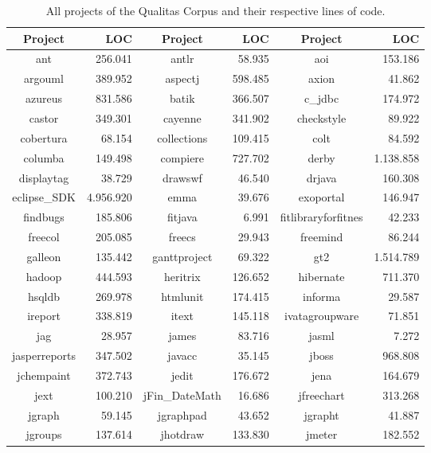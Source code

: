 \setlength{\extrarowheight}{-0.02em}
\begin{table}
	\caption[Overview over the projects in the Qualitas Corpus.]{All projects of the Qualitas Corpus and their respective lines of code.}
	\label{table:qualitasCorpusAll}
	\begin{tabularx}{\textwidth}{c|r||c|r||C|r}
		\textbf{Project} & \textbf{LOC} & \textbf{Project} & \textbf{LOC} & \textbf{Project} & \textbf{LOC} \\
		\hline
		ant & 256.041 & antlr & 58.935 & aoi & 153.186 \\
		argouml & 389.952 & aspectj & 598.485 & axion & 41.862 \\
		azureus & 831.586 & batik & 366.507 & c\_jdbc & 174.972 \\
		castor & 349.301 & cayenne & 341.902 & checkstyle & 89.922 \\
		cobertura & 68.154 & collections & 109.415 & colt & 84.592 \\
		columba & 149.498 & compiere & 727.702 & derby & 1.138.858 \\
		displaytag & 38.729 & drawswf & 46.540 & drjava & 160.308 \\
		eclipse\_SDK & 4.956.920 & emma & 39.676 & exoportal & 146.947 \\
		findbugs & 185.806 & fitjava & 6.991 & fitlibraryforfitnes & 42.233 \\
		freecol & 205.085 & freecs & 29.943 & freemind & 86.244 \\
		galleon & 135.442 & ganttproject & 69.322 & gt2 & 1.514.789 \\
		hadoop & 444.593 & heritrix & 126.652 & hibernate & 711.370 \\
		hsqldb & 269.978 & htmlunit & 174.415 & informa & 29.587 \\
		ireport & 338.819 & itext & 145.118 & ivatagroupware & 71.851 \\
		jag & 28.957 & james & 83.716 & jasml & 7.272 \\
		jasperreports & 347.502 & javacc & 35.145 & jboss & 968.808 \\
		jchempaint & 372.743 & jedit & 176.672 & jena & 164.679 \\
		jext & 100.210 & jFin\_DateMath & 16.686 & jfreechart & 313.268 \\
		jgraph & 59.145 & jgraphpad & 43.652 & jgrapht & 41.887 \\
		jgroups & 137.614 & jhotdraw & 133.830 & jmeter & 182.552 \\

\end{tabularx}
\end{table}
